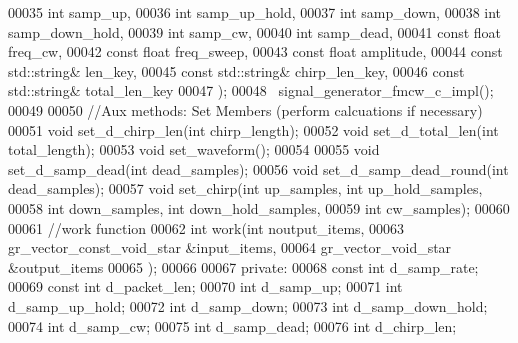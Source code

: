\begin{DoxyCode}
00035         \textcolor{keywordtype}{int} samp_up,
00036         \textcolor{keywordtype}{int} samp\_up\_hold,
00037         \textcolor{keywordtype}{int} samp_down,
00038         \textcolor{keywordtype}{int} samp\_down\_hold,
00039         \textcolor{keywordtype}{int} samp_cw,
00040         \textcolor{keywordtype}{int} samp\_dead,
00041         \textcolor{keyword}{const} \textcolor{keywordtype}{float} freq_cw,
00042         \textcolor{keyword}{const} \textcolor{keywordtype}{float} freq\_sweep,
00043         \textcolor{keyword}{const} \textcolor{keywordtype}{float} amplitude,
00044         \textcolor{keyword}{const} std::string& len\_key,
00045         \textcolor{keyword}{const} std::string& chirp\_len\_key,
00046         \textcolor{keyword}{const} std::string& total\_len\_key
00047       );
00048       ~signal_generator_fmcw_c_impl();
00049 
00050       \textcolor{comment}{//Aux methods: Set Members (perform calcuations if necessary)}
00051       \textcolor{keywordtype}{void} set_d_chirp_len(\textcolor{keywordtype}{int} chirp\_length);
00052       \textcolor{keywordtype}{void} set_d_total_len(\textcolor{keywordtype}{int} total\_length);
00053       \textcolor{keywordtype}{void} set_waveform();
00054 
00055       \textcolor{keywordtype}{void} set_d_samp_dead(\textcolor{keywordtype}{int} dead\_samples);
00056       \textcolor{keywordtype}{void} set_d_samp_dead_round(\textcolor{keywordtype}{int} dead\_samples);
00057       \textcolor{keywordtype}{void} set_chirp(\textcolor{keywordtype}{int} up\_samples, \textcolor{keywordtype}{int} up\_hold\_samples,
00058                      \textcolor{keywordtype}{int} down\_samples, \textcolor{keywordtype}{int} down\_hold\_samples,
00059                      \textcolor{keywordtype}{int} cw\_samples);
00060 
00061       \textcolor{comment}{//work function}
00062       \textcolor{keywordtype}{int} work(\textcolor{keywordtype}{int} noutput\_items,
00063           gr\_vector\_const\_void\_star &input\_items,
00064           gr\_vector\_void\_star &output\_items
00065       );
00066 
00067      \textcolor{keyword}{private}:
00068       \textcolor{keyword}{const} \textcolor{keywordtype}{int} d_samp_rate; 
00069       \textcolor{keyword}{const} \textcolor{keywordtype}{int} d_packet_len; 
00070       \textcolor{keywordtype}{int} d_samp_up; 
00071       \textcolor{keywordtype}{int} d_samp_up_hold; 
00072       \textcolor{keywordtype}{int} d_samp_down; 
00073       \textcolor{keywordtype}{int} d_samp_down_hold; 
00074       \textcolor{keywordtype}{int} d_samp_cw; 
00075       \textcolor{keywordtype}{int} d_samp_dead; 
00076       \textcolor{keywordtype}{int} d_chirp_len; 

\end{DoxyCode}
